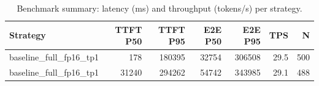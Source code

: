 \begin{table}
\caption{Benchmark summary: latency (ms) and throughput (tokens/s) per strategy.}
\label{tab:summary}
\begin{tabular}{lrrrrrr}
\toprule
Strategy & TTFT P50 & TTFT P95 & E2E P50 & E2E P95 & TPS & N \\
\midrule
baseline_full_fp16_tp1 & 178 & 180395 & 32754 & 306508 & 29.5 & 500 \\
baseline_full_fp16_tp1 & 31240 & 294262 & 54742 & 343985 & 29.1 & 488 \\
\bottomrule
\end{tabular}
\end{table}
